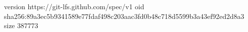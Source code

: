 version https://git-lfs.github.com/spec/v1
oid sha256:89a3ec5b9341589e77fdaf498c203aac3fd0b48c718d5599b3a43ef92ed2d8a3
size 387773

